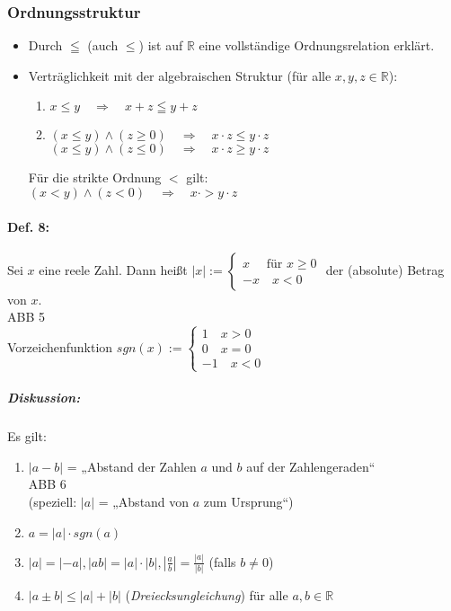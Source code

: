 \subsubsection{Ordnungsstruktur}
\begin{itemize}
\item Durch $\leqq$ (auch $\leq$) ist auf $\mathbb{R}$ eine vollständige Ordnungsrelation erklärt.
\item Verträglichkeit mit der algebraischen Struktur (für alle $x,y,z\in \mathbb{R}$):
\begin{enumerate}[label=(\arabic*)]
\item $x\leq y \quad \Rightarrow \quad x+z \leqq y+z$
\item $(x\leq y) \wedge (z \geq 0 )\quad \Rightarrow \quad x \cdot z \leq y \cdot z$\\
$(x\leq y) \wedge (z \leq 0 )\quad \Rightarrow \quad x \cdot z \geq y \cdot z$
\end{enumerate}
Für die strikte Ordnung $<$ gilt:\\
$\boxed{(x<y)\wedge (z<0) \quad \Rightarrow \quad x \cdot > y \cdot z}$
\end{itemize}
\paragraph{Def. 8:} \parskp
Sei $x$ eine reele Zahl. Dann heißt $|x|:=\begin{cases}
x \quad \text{ für } x\geq 0\\
-x \quad x <0
\end{cases}$ der (absolute) Betrag von $x$.\\
ABB 5\\
Vorzeichenfunktion $sgn(x):= \begin{cases}
1 \quad x>0\\
0 \quad x=0\\
-1 \quad x<0
\end{cases}$
\subparagraph{Diskussion:} Es gilt:
\begin{enumerate}
\item $|a-b|$ = „Abstand der Zahlen $a$ und $b$ auf der Zahlengeraden“\\
ABB 6\\
(speziell: $|a|$ = „Abstand von $a$ zum Ursprung“)
\item $a = |a| \cdot sgn (a)$
\item $|a|=|-a|, |ab|=|a|\cdot |b|, \left|\frac{a}{b}\right|=\frac{|a|}{|b|}$ (falls $b\not = 0$)
\item $|a \pm b| \leq |a| + |b|$ (\emph{Dreiecksungleichung}) für alle $a,b \in \mathbb{R}$
\end{enumerate}
